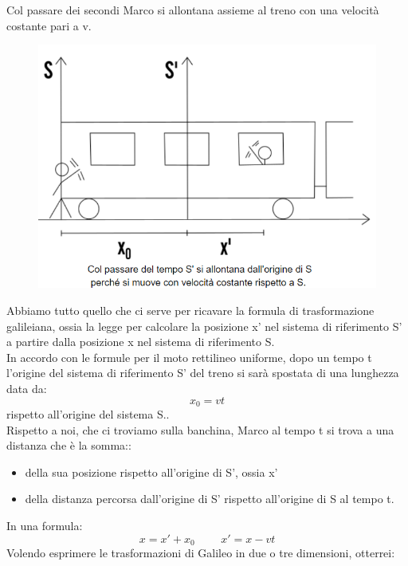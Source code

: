 \documentclass{article}
\begin{document}
Col passare dei secondi Marco si allontana assieme al treno con una velocità costante pari a v.\\
\begin{figure}[H]
    \centering
    \includegraphics[scale=0.4]{Trasformazioni di galileo 2.png}
    \label{fig:my_label}
\end{figure}
\noindent
Abbiamo tutto quello che ci serve per ricavare la formula di trasformazione galileiana, ossia la legge per calcolare la posizione x' nel sistema di riferimento S' a partire dalla posizione x nel sistema di riferimento S.\\
In accordo con le formule per il moto rettilineo uniforme, dopo un tempo t l'origine del sistema di riferimento S' del treno si sarà spostata di una lunghezza data da:
\begin{equation}
    x_{0}=vt
\end{equation}
rispetto all'origine del sistema S..\\
 Rispetto a noi, che ci troviamo sulla banchina, Marco al tempo t si trova a una distanza che è la somma::
 \begin{itemize}
     \item della sua posizione rispetto all'origine di S', ossia x'
     \item della distanza percorsa dall'origine di S' rispetto all'origine di S al tempo t.
 \end{itemize}
In una formula:
\begin{equation}
    x=x'+x_{0} \,\,\,\,\,\,\,\,\,\,\,\,\,\, x'=x-vt
\end{equation}
Volendo esprimere le trasformazioni di Galileo in due o tre dimensioni, otterrei:
\end{document}
